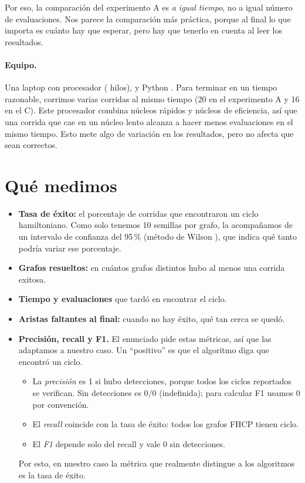 Por eso, la comparación del experimento A es \emph{a igual tiempo}, no a igual número de
evaluaciones. Nos parece la comparación más práctica, porque al final lo que importa es cuánto hay
que esperar, pero hay que tenerlo en cuenta al leer los resultados.

\begin{table}[H]
\centering\small\filas
\caption{Experimento A: evaluaciones usadas y por qué se detuvieron las corridas sin éxito.}
\label{tab:presupuesto}
\resizebox{\textwidth}{!}{}
\end{table}

\paragraph{Equipo.} Una laptop con procesador \cpu{} (\hilos{} hilos), \sistema{} y Python
\versionpython{}. Para terminar en un tiempo razonable, corrimos varias corridas al mismo tiempo
(20 en el experimento A y 16 en el C). Este procesador combina núcleos rápidos y núcleos de
eficiencia, así que una corrida que cae en un núcleo lento alcanza a hacer menos evaluaciones en
el mismo tiempo. Esto mete algo de variación en los resultados, pero no afecta que sean correctos.

\section{Qué medimos}
\begin{itemize}
  \item \textbf{Tasa de éxito:} el porcentaje de corridas que encontraron un ciclo hamiltoniano.
        Como solo tenemos 10 semillas por grafo, la acompañamos de un intervalo de confianza del
        95\,\% (método de Wilson \cite{wilson1927}), que indica qué tanto podría variar ese
        porcentaje.
  \item \textbf{Grafos resueltos:} en cuántos grafos distintos hubo al menos una corrida exitosa.
  \item \textbf{Tiempo y evaluaciones} que tardó en encontrar el ciclo.
  \item \textbf{Aristas faltantes al final:} cuando no hay éxito, qué tan cerca se quedó.
  \item \textbf{Precisión, recall y F1.} El enunciado pide estas métricas, así que las adaptamos a
        nuestro caso. Un ``positivo'' es que el algoritmo diga que encontró un ciclo.
        \begin{itemize}
          \item La \emph{precisión} es 1 si hubo detecciones, porque todos los ciclos
                reportados se verifican. Sin detecciones es $0/0$ (indefinida); para
                calcular F1 usamos 0 por convención.
          \item El \emph{recall} coincide con la tasa de éxito: todos los grafos FHCP
                tienen ciclo.
          \item El \emph{F1} depende solo del recall y vale 0 sin detecciones.
        \end{itemize}
        Por esto, en nuestro caso la métrica que realmente distingue a los algoritmos es la tasa
        de éxito.
\end{itemize}

